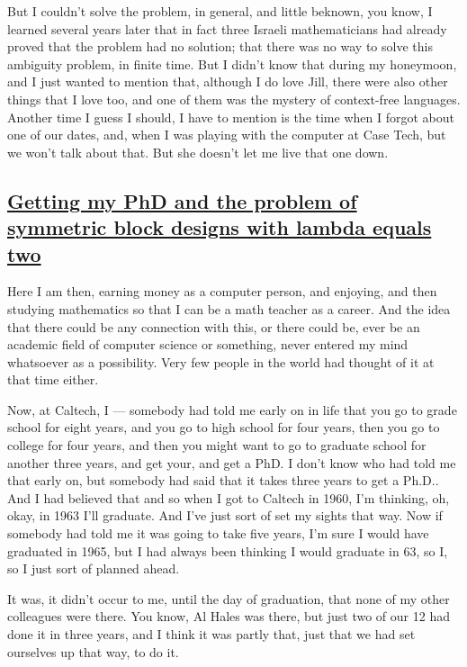 \documentclass[]{article}
\begin{document}
But I couldn't solve the problem, in general, and little beknown, you
know, I learned several years later that in fact three Israeli
mathematicians had already proved that the problem had no solution; that
there was no way to solve this ambiguity problem, in finite time. But I
didn't know that during my honeymoon, and I just wanted to mention that,
although I do love Jill, there were also other things that I love too,
and one of them was the mystery of context-free languages. Another time
I guess I should, I have to mention is the time when I forgot about one
of our dates, and, when I was playing with the computer at Case Tech,
but we won't talk about that. But she doesn't let me live that one down.

\subsection{\texorpdfstring{\href{http://webofstories.com/play/17090}{Getting
my PhD and the problem of symmetric block designs with lambda equals
two}}{Getting my PhD and the problem of symmetric block designs with lambda equals two}}\label{getting-my-phd-and-the-problem-of-symmetric-block-designs-with-lambda-equals-two}

Here I am then, earning money as a computer person, and enjoying, and
then studying mathematics so that I can be a math teacher as a career.
And the idea that there could be any connection with this, or there
could be, ever be an academic field of computer science or something,
never entered my mind whatsoever as a possibility. Very few people in
the world had thought of it at that time either.

Now, at Caltech, I --- somebody had told me early on in life that you go
to grade school for eight years, and you go to high school for four
years, then you go to college for four years, and then you might want to
go to graduate school for another three years, and get your, and get a
PhD. I don't know who had told me that early on, but somebody had said
that it takes three years to get a Ph.D.. And I had believed that and so
when I got to Caltech in 1960, I'm thinking, oh, okay, in 1963 I'll
graduate. And I've just sort of set my sights that way. Now if somebody
had told me it was going to take five years, I'm sure I would have
graduated in 1965, but I had always been thinking I would graduate in
63, so I, so I just sort of planned ahead.

It was, it didn't occur to me, until the day of graduation, that none of
my other colleagues were there. You know, Al Hales was there, but just
two of our 12 had done it in three years, and I think it was partly
that, just that we had set ourselves up that way, to do it.
\end{document}
